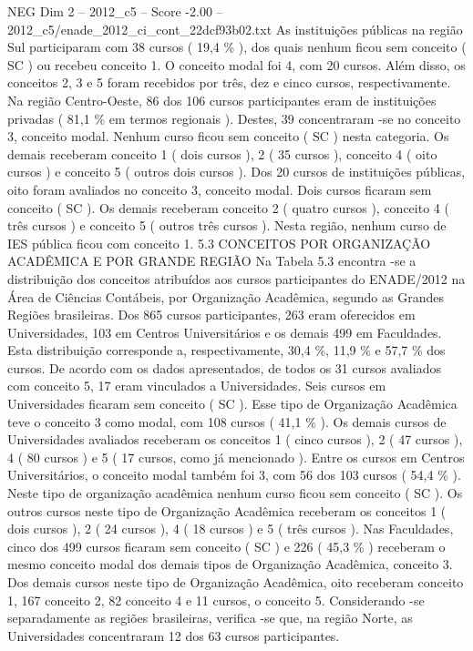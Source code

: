 \begin{textsample}{NEG Dim 2 – 2012\_c5 – Score -2.00 – 2012\_c5/enade\_2012\_ci\_cont\_22dcf93b02.txt}
As instituições públicas na região Sul participaram com 38 cursos ( 19,4 \% ), dos quais nenhum ficou sem conceito ( SC ) ou recebeu conceito 1.
O conceito modal foi 4, com 20 cursos.
Além disso, os conceitos 2, 3 e 5 foram recebidos por três, dez e cinco cursos, respectivamente.
Na região Centro-Oeste, 86 dos 106 cursos participantes eram de instituições privadas ( 81,1 \% em termos regionais ).
Destes, 39 concentraram -se no conceito 3, conceito modal.
Nenhum curso ficou sem conceito ( SC ) nesta categoria.
Os demais receberam conceito 1 ( dois cursos ), 2 ( 35 cursos ), conceito 4 ( oito cursos ) e conceito 5 ( outros dois cursos ).
Dos 20 cursos de instituições públicas, oito foram avaliados no conceito 3, conceito modal.
Dois cursos ficaram sem conceito ( SC ).
Os demais receberam conceito 2 ( quatro cursos ), conceito 4 ( três cursos ) e conceito 5 ( outros três cursos ).
Nesta região, nenhum curso de IES pública ficou com conceito 1. 5.3 CONCEITOS POR ORGANIZAÇÃO ACADÊMICA E POR GRANDE REGIÃO Na Tabela 5.3 encontra -se a distribuição dos conceitos atribuídos aos cursos participantes do ENADE/2012 na Área de Ciências Contábeis, por Organização Acadêmica, segundo as Grandes Regiões brasileiras.
Dos 865 cursos participantes, 263 eram oferecidos em Universidades, 103 em Centros Universitários e os demais 499 em Faculdades.
Esta distribuição corresponde a, respectivamente, 30,4 \%, 11,9 \% e 57,7 \% dos cursos.
De acordo com os dados apresentados, de todos os 31 cursos avaliados com conceito 5, 17 eram vinculados a Universidades.
Seis cursos em Universidades ficaram sem conceito ( SC ).
Esse tipo de Organização Acadêmica teve o conceito 3 como modal, com 108 cursos ( 41,1 \% ).
Os demais cursos de Universidades avaliados receberam os conceitos 1 ( cinco cursos ), 2 ( 47 cursos ), 4 ( 80 cursos ) e 5 ( 17 cursos, como já mencionado ).
Entre os cursos em Centros Universitários, o conceito modal também foi 3, com 56 dos 103 cursos ( 54,4 \% ).
Neste tipo de organização acadêmica nenhum curso ficou sem conceito ( SC ).
Os outros cursos neste tipo de Organização Acadêmica receberam os conceitos 1 ( dois cursos ), 2 ( 24 cursos ), 4 ( 18 cursos ) e 5 ( três cursos ).
Nas Faculdades, cinco dos 499 cursos ficaram sem conceito ( SC ) e 226 ( 45,3 \% ) receberam o mesmo conceito modal dos demais tipos de Organização Acadêmica, conceito 3.
Dos demais cursos neste tipo de Organização Acadêmica, oito receberam conceito 1, 167 conceito 2, 82 conceito 4 e 11 cursos, o conceito 5.
Considerando -se separadamente as regiões brasileiras, verifica -se que, na região Norte, as Universidades concentraram 12 dos 63 cursos participantes.

\end{textsample}
